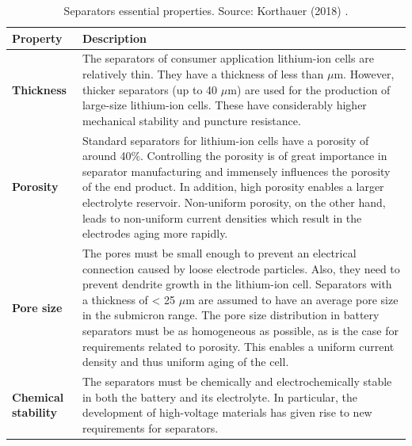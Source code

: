 \begin{table}[H]
    \centering
    \begin{footnotesize}
        \begin{tabular}{|p{18mm} p{132mm}|}
            \hline
            \rowcolor{bluepoli!40}
            \textbf{Property} & \textbf{Description}\T\B \\
            \hline \hline

            \textbf{Thickness} & The separators of consumer application lithium-ion cells are relatively thin. They have a thickness of less than $\mu$m. However, thicker separators (up to 40 $\mu$m) are used for the production of large-size lithium-ion cells. These have considerably higher mechanical stability and puncture resistance.\T\B\\
            \hline

            \textbf{Porosity} & Standard separators for lithium-ion cells have a porosity of around 40\%. Controlling the porosity is of great importance in separator manufacturing and immensely influences the porosity of the end product. In addition, high porosity enables a larger electrolyte reservoir. Non-uniform porosity, on the other hand, leads to non-uniform current densities which result in the electrodes aging more rapidly.\T\B\\
            \hline

            \textbf{Pore size} & The pores must be small enough to prevent an electrical connection caused by loose electrode particles. Also, they need to prevent dendrite growth in the lithium-ion cell. Separators with a thickness of < 25 $\mu$m are assumed to have an average pore size in the submicron range. The pore size distribution in battery separators must be as homogeneous as possible, as is the case for requirements related to porosity. This enables a uniform current density and thus uniform aging of the cell.\T\B\\
            \hline
            
            \textbf{Chemical stability} & The separators must be chemically and electrochemically stable in both the battery and its electrolyte. In particular, the development of high-voltage materials has given rise to new requirements for separators.\T\B\\
            \hline
        \end{tabular}
        \\[10pt]
        \caption[Separators essential properties]{Separators essential properties. Source: Korthauer (2018) \cite{korthauer2018lithium}.}
        \label{table:separator-properties}
    \end{footnotesize}
\end{table}


